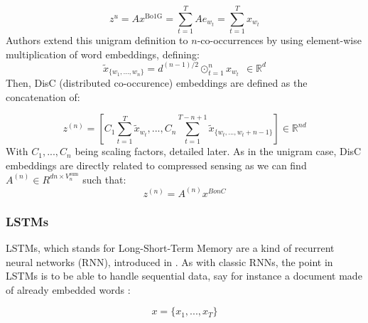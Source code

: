 \documentclass{article}
\newcommand{\R}{\mathbb R}
\begin{document}
\[z^u = Ax^{\text{Bo1G}} = \sum_{t=1}^T A e_{w_t} = \sum_{t=1}^T x_{w_t} \]
Authors extend this unigram definition to $n$-co-occurrences by using
element-wise multiplication of word embeddings, defining: 
\[\tilde{x}_{\{w_1, ..., w_n\}} = d^{(n-1)/2} \odot_{t=1}^n x_{w_t} \ \ \in \R^d \]
Then, DisC (distributed co-occurence) embeddings are defined as
the concatenation of:

\[
    z^{(n)} = \left [ 
                C_1 \sum_{t=1}^T \tilde{x}_{w_t}, 
                ..., 
                C_n \sum_{t=1}^{T-n+1} \tilde{x}_{\{w_t, ..., w_t+n-1\}}
              \right ]
              \in \R^{nd}
\]
With $C_1,..., C_n$ being scaling factors, detailed later. As in the 
unigram case, DisC embeddings are directly related to compressed sensing
as we can find $A^{(n)}\in R^{dn \times V_n^{\text{sum}}}$ such that:
\[z^{(n)} = A^{(n)}x^{BonC} \]


\subsubsection{LSTMs}

LSTMs, which stands for Long-Short-Term Memory are a kind of recurrent
neural networks (RNN), introduced in \cite{Hochreiter:1997:LSM:1246443.1246450}.
As with classic RNNs, the point in LSTMs is to be able to 
handle sequential data, say for instance a document made of already 
embedded words :

\[   x =\{x_1, ..., x_T \} \]
\end{document}

